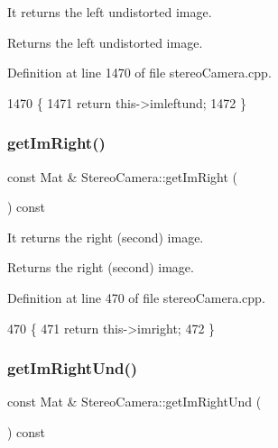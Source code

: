 It returns the left undistorted image. 

\begin{DoxyReturn}{Returns}
the left undistorted image. 
\end{DoxyReturn}


Definition at line 1470 of file stereo\+Camera.\+cpp.


\begin{DoxyCode}
1470                                             \{
1471     \textcolor{keywordflow}{return} this->imleftund;
1472 \}
\end{DoxyCode}
\mbox{\label{classStereoCamera_ac7930aa4fa0681246e74c08cf4b1079b}} 
\subsubsection{\texorpdfstring{get\+Im\+Right()}{getImRight()}}
{\footnotesize\ttfamily const Mat \& Stereo\+Camera\+::get\+Im\+Right (\begin{DoxyParamCaption}{ }\end{DoxyParamCaption}) const}



It returns the right (second) image. 

\begin{DoxyReturn}{Returns}
the right (second) image. 
\end{DoxyReturn}


Definition at line 470 of file stereo\+Camera.\+cpp.


\begin{DoxyCode}
470                                           \{
471     \textcolor{keywordflow}{return} this->imright;
472 \}
\end{DoxyCode}
\mbox{\label{classStereoCamera_a19009c20003a5c7e957a4b3c34913fe9}} 
\subsubsection{\texorpdfstring{get\+Im\+Right\+Und()}{getImRightUnd()}}
{\footnotesize\ttfamily const Mat \& Stereo\+Camera\+::get\+Im\+Right\+Und (\begin{DoxyParamCaption}{ }\end{DoxyParamCaption}) const}



